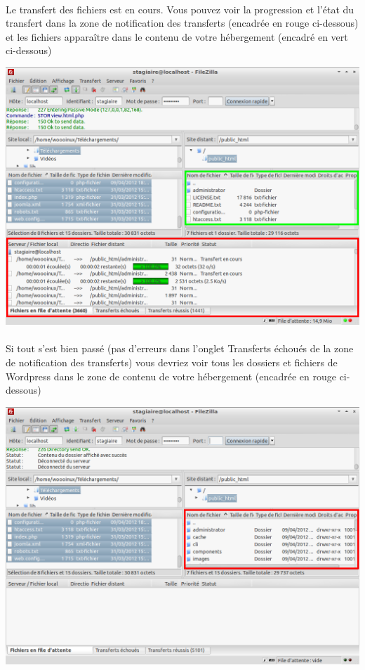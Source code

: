 \documentclass[10pt,a4paper]{article}
\begin{document}
\paragraph{}Le transfert des fichiers est en cours. Vous pouvez voir la progression et l'état du transfert dans la zone de notification des transferts (encadrée en rouge ci-dessous) et les fichiers apparaître dans le contenu de votre hébergement (encadré en vert ci-dessous)
\begin{center}
\includegraphics[scale=0.35]{img/0037.png}
\end{center}
\paragraph{}Si tout s'est bien passé (pas d'erreurs dans l'onglet Transferts échoués de la zone de notification des transferts) vous devriez voir tous les dossiers et fichiers de Wordpress dans le zone de contenu de votre hébergement (encadrée en rouge ci-dessous)
\begin{center}
\includegraphics[scale=0.35]{img/0038.png}
\end{center}
\end{document}
